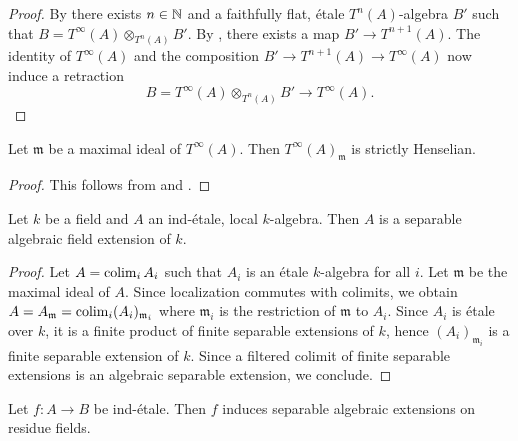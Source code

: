 \begin{proof}
    \leanok
    By 
    there exists $n \in \mathbb{N}$ and a faithfully flat, étale $T^n(A)$-algebra $B'$ such that
    $B = T^{\infty}(A) \otimes_{T^n(A)} B'$. By ,
    there exists a map $B' \to T^{n+1}(A)$. The identity of $T^{\infty}(A)$ and the composition
    $B' \to T^{n+1}(A) \to T^{\infty}(A)$ now induce a retraction
    \[
    B = T^{\infty}(A) \otimes_{T^n(A)} B' \to T^{\infty}(A)
    .\]
\end{proof}

\begin{corollary}
    Let $\mathfrak{m}$ be a maximal ideal of $T^{\infty}(A)$. Then $T^{\infty}(A)_{\mathfrak{m}}$
    is strictly Henselian.
    \label{cor:strictly-henselian-etale-contraction}
\end{corollary}

\begin{proof}
    This follows from  and .
\end{proof}

\begin{lemma}
    Let $k$ be a field and $A$ an ind-étale, local $k$-algebra. Then $A$ is
    a separable algebraic field extension of $k$.
    \label{lemma:field-local-ind-etale}
    \leanok
\end{lemma}

\begin{proof}
    \leanok
    Let $A = \operatorname{colim}_i A_i$ such that $A_i$ is an étale $k$-algebra for all $i$.
    Let $\mathfrak{m}$ be the maximal ideal of $A$. Since localization commutes with colimits,
    we obtain $A = A_{\mathfrak{m}} = \operatorname{colim}_i (A_i)_{\mathfrak{m}_i}$ where
    $\mathfrak{m}_i$ is the restriction of $\mathfrak{m}$ to $A_i$. Since $A_i$ is étale over $k$,
    it is a finite product of finite separable extensions of $k$, hence $(A_i)_{\mathfrak{m}_i}$
    is a finite separable extension of $k$. Since a filtered colimit of finite separable
    extensions is an algebraic separable extension, we conclude.
\end{proof}

\begin{proposition}
    Let $f\colon A \to B$ be ind-étale. Then $f$ induces separable algebraic 
    extensions on residue fields.
    \label{prop:ind-etale-residue-fields}
    \leanok
\end{proposition}

